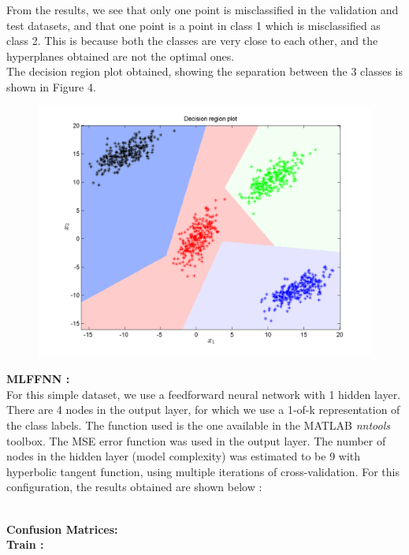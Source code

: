\documentclass{article}
\begin{document}
\begin{flushleft}
From the results, we see that only one point is misclassified in the validation and test datasets, and that one point is a point in class 1 which is misclassified as class 2. This is because both the classes are very close to each other, and the hyperplanes obtained are not the optimal ones. \\[10pt]

The decision region plot obtained, showing the separation between the 3 classes is shown in Figure 4.


\begin{figure}[H]
\centering
\includegraphics[width=\linewidth]{Classification/linearlySeparable/decn_region_perceptron.png}
\caption{}
\end{figure}
\newpage
\textbf{MLFFNN :} \\[10pt]

For this simple dataset, we use a feedforward neural network with 1 hidden layer. There are 4 nodes in the output layer, for which we use a 1-of-k representation of the class labels. The function used is the one available in the MATLAB \textit{nntools} toolbox. The MSE error function was used in the output layer.
The number of nodes in the hidden layer (model complexity) was estimated to be 9 with hyperbolic tangent function, using multiple iterations of cross-validation. For this configuration, the results obtained are shown below :
	
\textbf{\\[5pt]Confusion Matrices: \\[10pt]}
\textbf{Train :\\[5pt]}


\end{flushleft}
\end{document}
